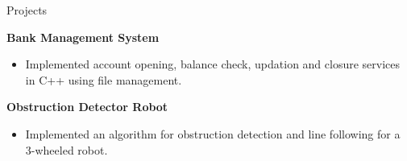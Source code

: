 \begin{rSection}{Projects}
\vspace{-.4cm}

%
%
%
%

\vspace{-.2cm}
\item{\bf Bank Management System}\\
[-0.4cm]

\begin{itemize}[leftmargin=*]

	\itemsep \sepval

  \item Implemented account opening, balance check, updation and closure services in C++ using file management.

\end{itemize}

\vspace{-.2cm}
\item{\bf Obstruction Detector Robot}\\
[-0.4cm]

\begin{itemize}[leftmargin=*]

	\itemsep \sepval

	\item Implemented an algorithm for obstruction detection and line following for a 3-wheeled robot.

\end{itemize}

\end{rSection}
